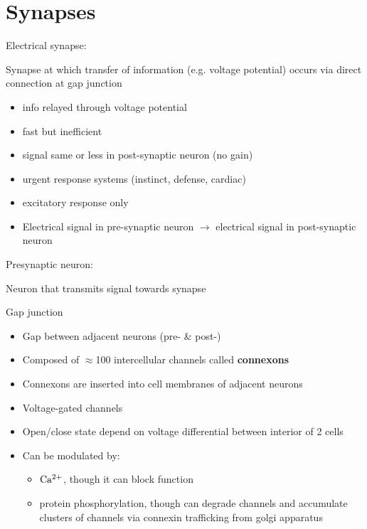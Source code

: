 \documentclass[11pt,fleqn]{book} %
\begin{document}
\section{Synapses}
\begin{descriptions}
    \item[Electrical synapse:] 
    \begin{descriptions}
    \end{descriptions}
    Synapse at which transfer of information (e.g. voltage potential) occurs via direct connection at gap junction
    \begin{itemize}
        \item info relayed through voltage potential
        \item fast but inefficient
        \item signal same or less in post-synaptic neuron (no gain)
        \item urgent response systems (instinct, defense, cardiac)
        \item excitatory response only
        \item Electrical signal in pre-synaptic neuron $\rightarrow$ electrical signal in post-synaptic neuron
    \end{itemize}
    \item[Presynaptic neuron:] 
    \begin{descriptions}
    \end{descriptions}
    Neuron that transmits signal towards synapse
    \item[Gap junction]
    \begin{descriptions}
    \end{descriptions}
    \begin{itemize}
        \item Gap between adjacent neurons (pre- \& post-)
        \item Composed of $\approx$100 intercellular channels called \textbf{connexons}
        \item Connexons are inserted into cell membranes of adjacent neurons
        \item Voltage-gated channels
        \item Open/close state depend on voltage differential between interior of 2 cells
        \item Can be modulated by:
        \begin{itemize}
            \item ${\rm Ca^{2+}}$, though it can block function
            \item protein phosphorylation, though can degrade channels and accumulate clusters of channels via connexin trafficking from golgi apparatus

\end{itemize}
\end{itemize}
\end{descriptions}
\end{document}
